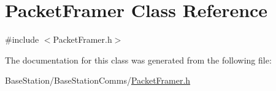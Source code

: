 \hypertarget{classPacketFramer}{\section{Packet\-Framer Class Reference}
\label{classPacketFramer}
}


{\ttfamily \#include $<$Packet\-Framer.\-h$>$}



The documentation for this class was generated from the following file\-:\begin{DoxyCompactItemize}
\item 
Base\-Station/\-Base\-Station\-Comms/\hyperlink{PacketFramer_8h}{Packet\-Framer.\-h}\end{DoxyCompactItemize}

